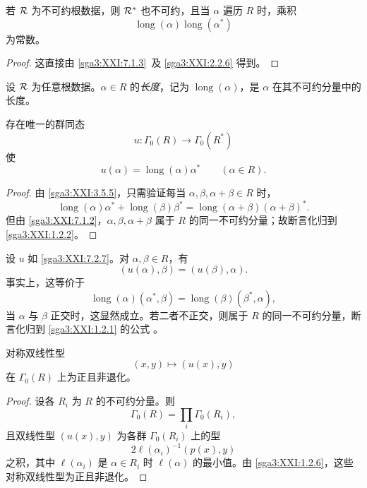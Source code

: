 \begin{lemma}\label{sga3:XXI:7.2.5}
若 \(\mathcal{R}\) 为不可约根数据，则 \(\mathcal{R}^\ast\) 也不可约，且当 \(\alpha\) 遍历 \(R\) 时，乘积
\[
 \operatorname{long}(\alpha)\operatorname{long}(\alpha^\ast)
\]
为常数。
\end{lemma}

\begin{proof}
这直接由 \ref{sga3:XXI:7.1.3}\, 及 \ref{sga3:XXI:2.2.6} 得到。
\end{proof}

\begin{definition}\label{sga3:XXI:7.2.6}
设 \(\mathcal{R}\) 为任意根数据。\(\alpha\in R\) 的\emph{长度}，记为 \(\operatorname{long}(\alpha)\)，是 \(\alpha\) 在其不可约分量中的长度。
\end{definition}

\begin{lemma}\label{sga3:XXI:7.2.7}
存在唯一的群同态
\[
 u:\Gamma_0(R)\longrightarrow\Gamma_0(R^\ast)
\]
使
\[
 u(\alpha)=\operatorname{long}(\alpha)\alpha^\ast
 \qquad(\alpha\in R).
\]
\end{lemma}

\begin{proof}
由 \ref{sga3:XXI:3.5.5}，只需验证每当 \(\alpha,\beta,\alpha+\beta\in R\) 时，
\[
 \operatorname{long}(\alpha)\alpha^\ast+
 \operatorname{long}(\beta)\beta^\ast
 =
 \operatorname{long}(\alpha+\beta)(\alpha+\beta)^\ast.
\]
但由 \ref{sga3:XXI:7.1.2}，\(\alpha,\beta,\alpha+\beta\) 属于 \(R\) 的同一不可约分量；故断言化归到 \ref{sga3:XXI:1.2.2}。
\end{proof}

\begin{remark}\label{sga3:XXI:7.2.8}
设 \(u\) 如 \ref{sga3:XXI:7.2.7}。对 \(\alpha,\beta\in R\)，有
\[
 (u(\alpha),\beta)=(u(\beta),\alpha).
\]
事实上，这等价于
\[
 \operatorname{long}(\alpha)(\alpha^\ast,\beta)
 =
 \operatorname{long}(\beta)(\beta^\ast,\alpha),
\]
当 \(\alpha\) 与 \(\beta\) 正交时，这显然成立。若二者不正交，则属于 \(R\) 的同一不可约分量，断言化归到 \ref{sga3:XXI:1.2.1} 的公式 。
\end{remark}

\begin{remark}\label{sga3:XXI:7.2.9}
对称双线性型
\[
 (x,y)\longmapsto(u(x),y)
\]
在 \(\Gamma_0(R)\) 上为正且非退化。
\end{remark}

\begin{proof}
设各 \(R_i\) 为 \(R\) 的不可约分量。则
\[
 \Gamma_0(R)=\prod_i\Gamma_0(R_i),
\]
且双线性型 \((u(x),y)\) 为各群 \(\Gamma_0(R_i)\) 上的型
\[
 2\ell(\alpha_i)^{-1}(p(x),y)
\]
之积，其中 \(\ell(\alpha_i)\) 是 \(\alpha\in R_i\) 时 \(\ell(\alpha)\) 的最小值。由 \ref{sga3:XXI:1.2.6}，这些对称双线性型为正且非退化。
\end{proof}

